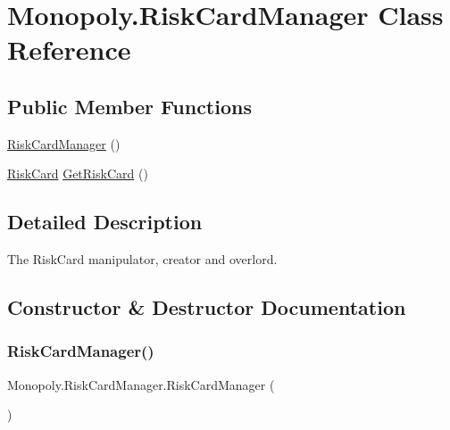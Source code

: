 \hypertarget{class_monopoly_1_1_risk_card_manager}{}\section{Monopoly.\+Risk\+Card\+Manager Class Reference}
\label{class_monopoly_1_1_risk_card_manager}
\subsection*{Public Member Functions}
\begin{DoxyCompactItemize}
\item 
\mbox{\hyperlink{class_monopoly_1_1_risk_card_manager_a7721ce2a33d3fc00d3a40068a5f09d2d}{Risk\+Card\+Manager}} ()
\item 
\mbox{\hyperlink{class_monopoly_1_1_main_1_1_risk_card}{Risk\+Card}} \mbox{\hyperlink{class_monopoly_1_1_risk_card_manager_a43593d584bea56a241b9d58fd71429ae}{Get\+Risk\+Card}} ()
\end{DoxyCompactItemize}


\subsection{Detailed Description}
The Risk\+Card manipulator, creator and overlord. 

\subsection{Constructor \& Destructor Documentation}
\mbox{\label{class_monopoly_1_1_risk_card_manager_a7721ce2a33d3fc00d3a40068a5f09d2d}} 
\subsubsection{\texorpdfstring{Risk\+Card\+Manager()}{RiskCardManager()}}
{\footnotesize\ttfamily Monopoly.\+Risk\+Card\+Manager.\+Risk\+Card\+Manager (\begin{DoxyParamCaption}{ }\end{DoxyParamCaption})\hspace{0.3cm}{\ttfamily [inline]}}

